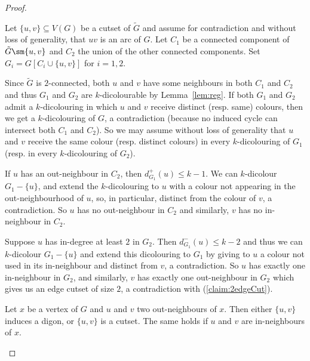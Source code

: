 \begin{proof}
\begin{proofclaim}
Let $\{u,v\} \subseteq V(G)$ be a cutset of $\tilde{G}$ and assume for contradiction and without loss of generality, that $uv$ is an arc of $G$. 
Let $C_{1}$ be a connected component of $\tilde G \sm \{u,v\}$ and $C_2$ the union of the other connected components.  Set $G_{i} = G[C_{i} \cup \{u, v\}]$ for $i=1,2$.

Since $\tilde{G}$ is $2$-connected, both $u$ and $v$ have some neighbours in both $C_1$ and $C_2$ and thus $G_1$ and $G_2$ are $k$-dicolourable by Lemma~\ref{lem:reg}.
 If both $G_1$ and $G_2$ admit a $k$-dicolouring in which $u$ and $v$ receive distinct (resp. same) colours, then we get a $k$-dicolouring of $G$, a contradiction (because no induced cycle can intersect both $C_1$ and $C_2$). 
 So we may assume without loss of generality that $u$ and $v$ receive the same colour (resp. distinct colours) in every $k$-dicolouring of $G_1$ (resp. in every $k$-dicolouring of $G_2$). 

If $u$ has an out-neighbour in $C_2$, then $d_{G_1}^+(u) \leq k-1$. We can $k$-dicolour $G_1 - \{u\}$, and extend the $k$-dicolouring to $u$ with a colour not appearing in the out-neighbourhood of $u$, so, in particular, distinct from the colour of $v$, a contradiction.
So $u$ has no out-neighbour in $C_2$ and similarly, $v$ has no in-neighbour in $C_2$. 

Suppose $u$ has in-degree at least $2$ in $G_{2}$. Then $d_{G_1}^-(u) \leq k-2$ and thus we can $k$-dicolour $G_1 - \{u\}$ and extend this dicolouring to $G_1$ by giving to $u$ a colour not used in its in-neighbour and distinct from $v$, a contradiction. 
So $u$ has exactly one in-neighbour in $G_2$, and similarly, $v$ has exactly one out-neighbour in $G_2$ which gives us an edge cutset of size $2$, a contradiction with (\ref{claim:2edgeCut}).
\end{proofclaim}

\begin{claim}\label{claim:lovasz}
Let $x$ be a vertex of $G$ and $u$ and $v$ two out-neighbours of $x$. Then either $\{u,v\}$ induces a digon, or $\{u,v\}$ is a cutset. The same holds if $u$ and $v$ are in-neighbours of $x$. 
\end{claim}


\end{proof}
